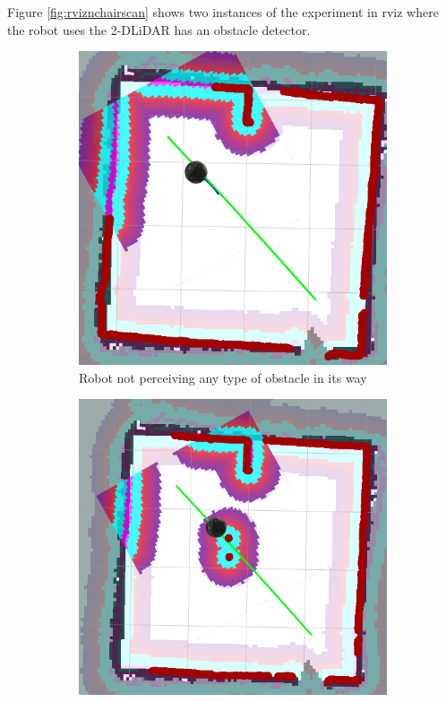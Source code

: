 Figure \ref{fig:rviznchairscan} shows two instances of the experiment in rviz where the robot uses the 2-D\ac{LiDAR} has an obstacle detector.
\begin{figure}[ht!]
  \centering
  \begin{subfigure}[t]{0.3\linewidth}
    \includegraphics[width=\linewidth]{imgs/chapter5/rviznchairscan3.png}
     \caption{Robot not perceiving any type of obstacle in its way}
     \label{fig::rviznchairscan1}
  \end{subfigure}
  \begin{subfigure}[t]{0.32\linewidth}
    \includegraphics[width=\linewidth]{imgs/chapter5/rviznchairscan1.png}

\end{subfigure}
\end{figure}
